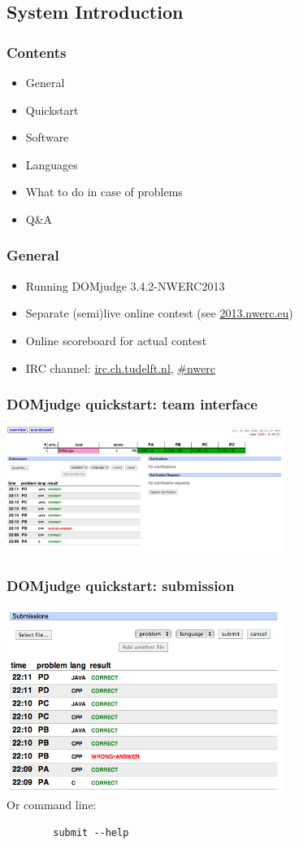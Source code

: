 \documentclass[t]{beamer}
\begin{document}
\subsection{System Introduction}
\begin{frame}
	\frametitle{Contents}
		\begin{itemize}
		\item General
		\item Quickstart
		\item Software
		\item Languages
		\item What to do in case of problems
		\item Q\&A
	\end{itemize}
\end{frame}
\begin{frame}[fragile]
\frametitle{General}
	\begin{itemize}
		\item Running DOMjudge 3.4.2-NWERC2013
		\item Separate (semi)live online contest (see \url{2013.nwerc.eu})
		\item Online scoreboard for actual contest
		\item IRC channel: \url{irc.ch.tudelft.nl}, \url{#nwerc}
	\end{itemize}
\end{frame}
\begin{frame}
	\frametitle{DOMjudge quickstart: team interface}
	\includegraphics[width=90mm]{teaminterface.png}
	\end{frame}
\begin{frame}[fragile]
\frametitle{DOMjudge quickstart: submission}
	\includegraphics[width=90mm]{submissions.png}
	\\Or command line:
	\begin{lstlisting}
		submit --help
	\end{lstlisting}
\end{frame}
\end{document}
